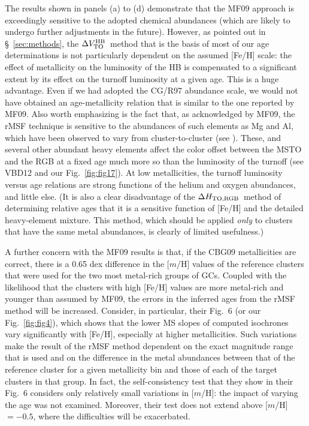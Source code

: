 \documentclass[12pt,preprint]{aastex}
\newcommand\delv{\Delta V^{\rm HB}_{\rm TO}}
\newcommand\delc{\Delta H_{\rm TO,RGB}}
\begin{document}
The results shown in panels (a) to (d) demonstrate that the MF09 approach is
exceedingly sensitive to the adopted chemical abundances (which are likely
to undergo further adjustments in the future).  However, as pointed out in
\S~\ref{sec:methods}, the $\delv$\ method that is the basis of most of our age
determinations is not particularly dependent on the assumed [Fe/H] scale: the
effect of metallicity on the luminosity of the HB is compensated to a
significant extent by its effect on the turnoff luminosity at a given age.  This
is a huge advantage.  Even if we had adopted the CG/R97 abundance scale, we
would not have obtained an age-metallicity relation that is similar to the one
reported by MF09.  Also worth emphasizing is the fact that, as acknowledged by
MF09, the rMSF technique is sensitive to the abundances of such elements as Mg
and Al, which have been observed to vary from cluster-to-cluster (see
\citealt{cbg09b}).  These, and several other abundant heavy elements affect the
color offset between the MSTO and the RGB at a fixed age much more so than the
luminosity of the turnoff (see VBD12 and our Fig.~\ref{fig:fig17}).  At low
metallicities, the turnoff luminosity versus age relations are strong functions
of the helium and oxygen abundances, and little else.  (It is also a clear
disadvantage of the $\delc$\ method of determining relative ages that it is a
sensitive function of [Fe/H] and the detailed heavy-element mixture.  This
method, which should be applied {\it only} to clusters that have the same
metal abundances, is clearly of limited usefulness.)

A further concern with the MF09 results is that, if the CBG09 metallicities
are correct, there is a 0.65 dex difference in the [$m$/H] values of the
reference clusters that were used for the two most metal-rich groups of GCs.
Coupled with the likelihood that the clusters with high [Fe/H] values are
more metal-rich and younger than assumed by MF09, the errors in the inferred
ages from the rMSF method will be increased.  Consider, in particular, their
Fig.~6 (or our Fig.~\ref{fig:fig4}), which shows that the lower MS slopes of
computed isochrones vary significantly with [Fe/H], especially at higher
metallicities.  Such variations make the result of the rMSF method dependent
on the exact magnitude range that is used and on the difference in the metal
abundances between that of the reference cluster for a given metallicity bin
and those of each of the target clusters in that group.  In fact, the
self-consistency test that they show in their Fig.~6 considers only relatively
small variations in [$m$/H]: the impact of varying the age was not examined.
Moreover, their test does not extend above [$m$/H] $= -0.5$, where the
difficulties will be exacerbated.
\end{document}
